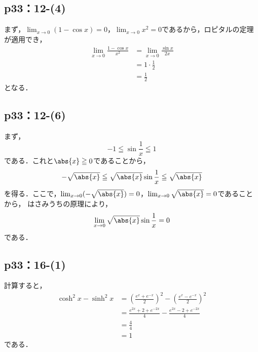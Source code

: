 \documentclass[uplatex,dvipdfmx,a4paper,10pt,fleqn]{jsarticle}
\begin{document}
\subsection*{p33：12-(4)}

\begin{tleftbar}
    まず，$\lim_{x \to 0} (1-\cos x)=0$，$\lim_{x \to 0} x^2 =0$であるから，ロピタルの定理が適用でき，
    \begin{align*} 
        \lim_{x \to 0} \frac{1-\cos x}{x^2} &= \lim_{x \to 0} \frac{\sin x}{2x} \\
        & = 1\cdot \frac{1}{2} \\
        & = \frac{1}{2}
    \end{align*} 
    となる．
\end{tleftbar}





\subsection*{p33：12-(6)}

\begin{tleftbar}
    まず，
    \[
        -1 \leqq \sin \frac{1}{x} \leqq 1 
    \]
    である．これと$\abs{x} \geqq 0$であることから，
    \[
        -\sqrt{\abs{x}}\leqq \sqrt{\abs{x}} \sin \frac{1}{x} \leqq \sqrt{\abs{x}}
     \]
     を得る．ここで，$\lim_{x \to 0} (-\sqrt{\abs{x}})=0$，$\lim_{x \to 0} \sqrt{\abs{x}}=0$であることから，
     はさみうちの原理により，
     \[
        \lim_{x \to 0} \sqrt{\abs{x}} \sin \frac{1}{x} =0
     \]
     である．
\end{tleftbar}

\subsection*{p33：16-(1)}

\begin{tleftbar} 
    計算すると，
    \begin{align*} 
        \cosh ^2 x - \sinh ^2 x & = \left ( \frac{e^x + e^{-x}}{2} \right)^2 - \left ( \frac{e^x - e^{-x}}{2} \right)^2 \\
        & = \frac{e^{2x}+2 + e^{-2x}}{4}- \frac{e^{2x}-2 + e^{-2x}}{4} \\
        & = \frac{4}{4} \\
        & =1 
    \end{align*} 
    である．
\end{tleftbar}
\end{document}
